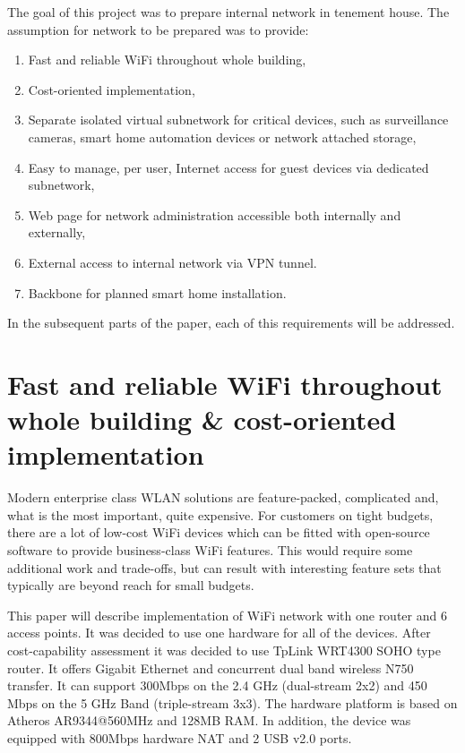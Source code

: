 \documentclass{llncs}
\begin{document}
The goal of this project was to prepare internal network in tenement house. The
assumption for network to be prepared was to provide:

\begin{enumerate}
  \item Fast and reliable WiFi throughout whole building,
  \item Cost-oriented implementation,
  \item Separate isolated virtual subnetwork for critical devices, such as surveillance cameras, smart home automation devices or network attached storage,
  \item Easy to manage, per user, Internet access for guest devices via dedicated subnetwork,
  \item Web page for network administration accessible both internally and
  externally,
  \item External access to internal network via VPN tunnel.
  \item Backbone for planned smart home installation.
\end{enumerate}

In the subsequent parts of the paper, each of this requirements will be addressed.

\section{Fast and reliable WiFi throughout whole building \& cost-oriented implementation}
Modern enterprise class WLAN solutions are feature-packed, complicated and, what is the most important, quite expensive. For customers on tight budgets, there are a lot of low-cost WiFi devices which can be fitted with open-source software to provide business-class WiFi features. This would require some additional work and trade-offs, but can result with interesting feature sets that typically are beyond reach for small budgets.

This paper will describe implementation of WiFi network with one router and 6 access points. It was decided to use one hardware for all of the devices. After cost-capability assessment it was decided to use TpLink WRT4300 SOHO type router. It offers Gigabit Ethernet and concurrent dual band wireless N750 transfer. It can support 300Mbps on the 2.4 GHz (dual-stream 2x2) and 450 Mbps on the 5 GHz Band (triple-stream 3x3). The hardware platform is based on Atheros AR9344@560MHz and 128MB RAM. In addition, the device was equipped with 800Mbps hardware NAT and 2 USB v2.0 ports. 
\end{document}
